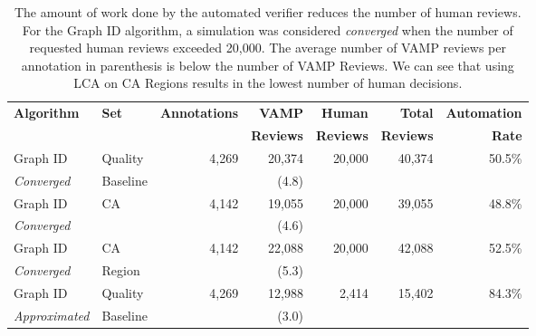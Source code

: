 \begin{table}[!t]
    \caption{The amount of work done by the automated verifier reduces the number of human reviews. For the Graph ID algorithm, a simulation was considered \textit{converged} when the number of requested human reviews exceeded 20,000.  The average number of VAMP reviews per annotation in parenthesis is below the number of VAMP Reviews.  We can see that using LCA on CA Regions results in the lowest number of human decisions.}
    \label{table:vamp-work}
    \begin{center}
        \begin{tabular}{| l | l | r | r | r | r | r |}
            \hline
            \textbf{Algorithm}    & \textbf{Set} & \textbf{Annotations} & \textbf{VAMP}    & \textbf{Human}   & \textbf{Total}   & \textbf{Automation} \\
                                  &              &                      & \textbf{Reviews} & \textbf{Reviews} & \textbf{Reviews} & \textbf{Rate}       \\
            \hline
            \hline
            Graph ID              & Quality      & 4,269                & 20,374           & 20,000           & 40,374           & 50.5\%              \\
            \textit{Converged}    & Baseline     &                      & (4.8)            &                  &                  &                     \\
            \hline
            Graph ID              & CA           & 4,142                & 19,055           & 20,000           & 39,055           & 48.8\%              \\
            \textit{Converged}    &              &                      & (4.6)            &                  &                  &                     \\
            \hline
            Graph ID              & CA           & 4,142                & 22,088           & 20,000           & 42,088           & 52.5\%              \\
            \textit{Converged}    & Region       &                      & (5.3)            &                  &                  &                     \\
            \hline
            \hline
            Graph ID              & Quality      & 4,269                & 12,988           & 2,414            & 15,402           & 84.3\%              \\
            \textit{Approximated} & Baseline     &                      & (3.0)            &                  &                  &                     \\

\end{tabular}
\end{center}
\end{table}
